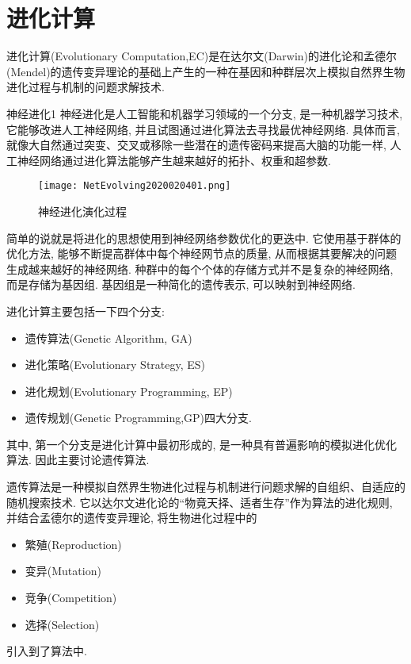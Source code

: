 \section{进化计算}
进化计算(Evolutionary Computation,EC)是在达尔文(Darwin)的进化论和孟德尔(Mendel)的遗传变异理论的基础上产生的一种在基因和种群层次上模拟自然界生物进化过程与机制的问题求解技术.
\begin{mydef}{神经进化}{1}
    神经进化是人工智能和机器学习领域的一个分支, 是一种机器学习技术, 它能够改进人工神经网络, 并且试图通过进化算法去寻找最优神经网络.
    具体而言, 就像大自然通过突变、交叉或移除一些潜在的遗传密码来提高大脑的功能一样, 人工神经网络通过进化算法能够产生越来越好的拓扑、权重和超参数.
\end{mydef}
\begin{figure}[H]
\centering
\texttt{[image: NetEvolving2020020401.png]}
\caption{神经进化演化过程}
\label{NetEvolving2020020401}
\end{figure}
简单的说就是将进化的思想使用到神经网络参数优化的更迭中.
它使用基于群体的优化方法, 能够不断提高群体中每个神经网节点的质量, 从而根据其要解决的问题生成越来越好的神经网络.
种群中的每个个体的存储方式并不是复杂的神经网络, 而是存储为基因组. 基因组是一种简化的遗传表示, 可以映射到神经网络.

进化计算主要包括一下四个分支:
\begin{itemize}
\item 遗传算法(Genetic Algorithm, GA)
\item 进化策略(Evolutionary Strategy, ES)
\item 进化规划(Evolutionary Programming, EP)
\item 遗传规划(Genetic Programming,GP)四大分支.
\end{itemize}
其中, 第一个分支是进化计算中最初形成的, 是一种具有普遍影响的模拟进化优化算法. 因此主要讨论遗传算法.

遗传算法是一种模拟自然界生物进化过程与机制进行问题求解的自组织、自适应的随机搜索技术. 它以达尔文进化论的“物竟天择、适者生存”作为算法的进化规则, 并结合孟德尔的遗传变异理论, 将生物进化过程中的
\begin{itemize}
\item 繁殖(Reproduction)
\item 变异(Mutation)
\item 竞争(Competition)
\item 选择(Selection)
\end{itemize}
引入到了算法中.

